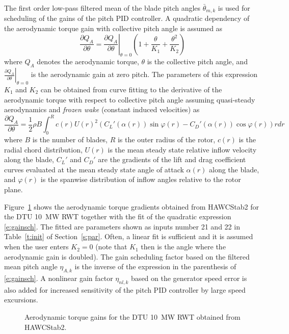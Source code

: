 The first order low-pass filtered mean of the blade pitch angles $\bar \theta_{m,k}$ is used for scheduling of the gains of the pitch PID controller. A quadratic dependency of the aerodynamic torque gain with collective pitch angle is assumed as
\begin{equation}\label{e:gainsch}
\frac{\partial Q_A}{\partial \theta}= \left. \frac{\partial Q_A}{\partial \theta}\right|_{\theta=0}\left(1 + \frac{\theta}{K_{1}} + \frac{\theta^2}{K_{2}}\right)
\end{equation}
where $Q_A$ denotes the aerodynamic torque, $\theta$ is the collective pitch angle, and $\left. \frac{\partial Q_A}{\partial \theta}\right|_{\theta=0}$ is the aerodynamic gain at zero pitch. The parameters of this expression $K_1$ and $K_2$ can be obtained from curve fitting to the derivative of the aerodynamic torque with respect to collective pitch angle assuming quasi-steady aerodynamics and \emph{frozen wake} (constant induced velocities) as
\begin{equation}\label{e:dqadt}
\frac{\partial Q_A}{\partial \theta} = \frac12 \rho B \int_0^R c(r) U(r)^2 \left(
  C_L'(\alpha(r)) \sin \varphi(r)
- C_D'(\alpha(r)) \cos \varphi(r) \right) r dr
\end{equation}
where $B$ is the number of blades, $R$ is the outer radius of the rotor, $c(r)$ is the radial chord distribution, $U(r)$ is the mean steady state relative inflow velocity along the blade, $C_L'$ and $C_D'$ are the gradients of the lift and drag coefficient curves evaluated at the mean steady state angle of attack $\alpha(r)$ along the blade, and $\varphi(r)$ is the spanwise distribution of inflow angles relative to the rotor plane.

Figure~\ref{f:gainsch} shows the aerodynamic torque gradients obtained from HAWCStab2 for the DTU 10~MW RWT together with the fit of the quadratic expression \eqref{e:gainsch}. The fitted are parameters shown as inputs number 21 and 22 in Table~\ref{t:init} of Section~\ref{s:par}. Often, a linear fit is sufficient and it is assumed when the user enters $K_2=0$ (note that $K_1$ then is the angle where the aerodynamic gain is doubled). The gain scheduling factor based on the filtered mean pitch angle $\eta_{A,k}$ is the inverse of the expression in the parenthesis of \eqref{e:gainsch}. A nonlinear gain factor $\eta_{nl,k}$ based on the generator speed error is also added for increased sensitivity of the pitch PID controller by large speed excursions.

\begin{figure}[b!]
\centerline{ }
\caption{Aerodynamic torque gains for the DTU 10~MW RWT obtained from HAWCStab2. \label{f:gainsch}}
\end{figure}

